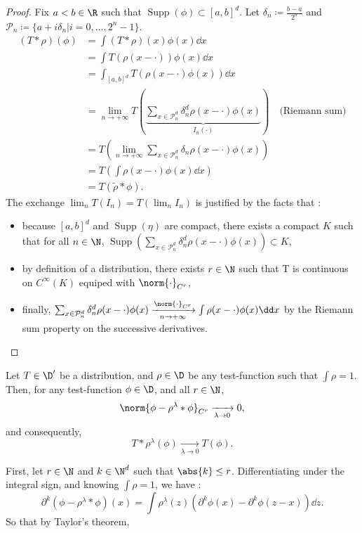 \begin{proof}
    Fix $a<b\in \R$ such that $\operatorname{Supp}(\phi)\subset [a,b]^d.$
    Let $\delta_n \coloneq \frac{b-a}{2^n}$ and $\mathcal{P}_n \coloneq \{a+i\delta_n \vert i = 0, \dots, 2^n - 1\}.$
    \begin{align*}
        (T*\rho) (\phi) &= \int (T*\rho)(x) \phi(x) \dd x \\
        &= \int T(\rho(x- \cdot)) \phi(x) \dd x \\
        &= \int_{[a,b]^d} T(\rho(x- \cdot)\phi(x)) \dd x \\
        &= \lim_{n \to +\infty} T(\underbrace{\sum_{x \in \mathcal{P}_n^d}\delta_n^d \rho(x- \cdot)\phi(x)}_{I_n(\cdot)}) \quad \text{(Riemann sum)}\\
        &= T(\lim_{n \to +\infty} \sum_{x \in \mathcal{P}_n^d}\delta_n \rho(x- \cdot)\phi(x)) \\
        &= T(\int\rho(x- \cdot)\phi(x) \dd x)\\
        &= T(\tilde{\rho}*\phi).
    \end{align*}
    The exchange $\lim_n T(I_n) = T(\lim_n I_n)$ is justified by the facts that :
    \begin{itemize}
        \item because $[a,b]^d$ and $\operatorname{Supp}(\eta)$ are compact, there exists a compact $K$ such that for all $n\in \N$, $\operatorname{Supp}(\sum_{x \in \mathcal{P}_n^d}\delta_n^d \rho(x- \cdot)\phi(x))\subset K$,
        \item by definition of a distribution, there exists $r\in \N$ such that T is continuous on $C^\infty(K)$ equiped with $\norm{\cdot}_{C^r}$,
        \item finally, $\sum_{x \in \mathcal{P}_n^d}\delta_n^d \rho(x- \cdot)\phi(x) \xrightarrow[n\to + \infty]{\norm{\cdot}_{C^r}} \int\rho(x- \cdot)\phi(x) \dd x $ by the Riemann sum property on the successive derivatives.
    \end{itemize}
\end{proof}

\begin{theorem}[Mollification]
    Let $T \in \D'$ be a distribution, and $\rho \in \D$ be any test-function such that $\int \rho = 1$.
    Then, for any test-function $\phi \in \D$, and all $r\in \N$,
    \begin{equation*}
        \norm{\phi - \rho^\lambda * \phi}_{C^r} \xrightarrow[\lambda \to 0]{} 0,
    \end{equation*}
    and consequently,
    \begin{equation*}
        T*\rho^\lambda(\phi) \xrightarrow[\lambda \to 0]{} T(\phi).
    \end{equation*}
\end{theorem}
First, let $r\in \N$ and $k\in \N^d$ such that $\abs{k}\leq r$.
Differentiating under the integral sign, and knowing $\int \rho = 1$, we have :
\begin{equation*}
    \partial^k(\phi - \rho^\lambda * \phi)(x) = \int \rho^\lambda(z) (\partial^k \phi(x)- \partial^k \phi(z - x)) \dd z.
\end{equation*}
So that by Taylor's theorem,


